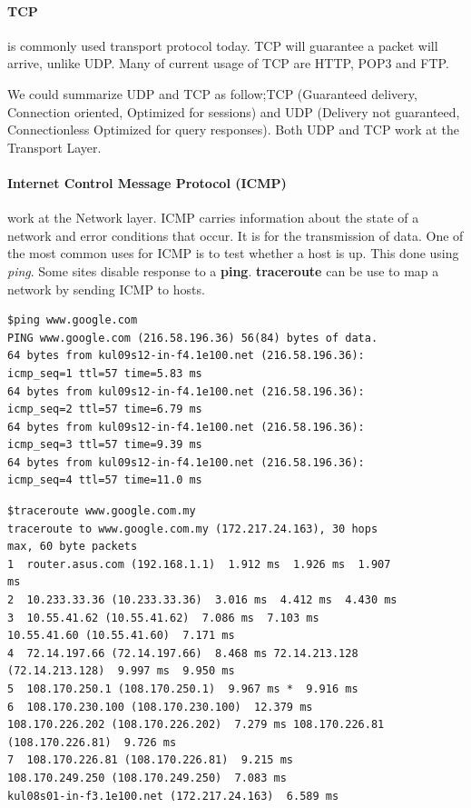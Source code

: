 \documentclass[7x9]{times}
\begin{document}
\paragraph{TCP} is commonly used transport protocol today. 
TCP will guarantee a packet will arrive, unlike UDP. Many 
of current usage of TCP are HTTP, POP3 and FTP.


We could summarize UDP and TCP as follow;TCP (Guaranteed
delivery, Connection oriented, Optimized for sessions) and
UDP (Delivery not guaranteed, Connectionless Optimized for
query responses). Both UDP and TCP work at the Transport
Layer.

\paragraph{Internet Control Message Protocol (ICMP)} work at
the Network layer. ICMP carries information about the state
of a network and error conditions that occur. It is for the
transmission of data. One of the most common uses for ICMP 
is to test whether a host is up. This done using 
\textit{ping}. Some sites disable response to a 
\textbf{ping}. \textbf{traceroute} can be use to map a 
network by sending ICMP to hosts.

\begin{verbatim}
$ping www.google.com
PING www.google.com (216.58.196.36) 56(84) bytes of data.
64 bytes from kul09s12-in-f4.1e100.net (216.58.196.36): 
icmp_seq=1 ttl=57 time=5.83 ms
64 bytes from kul09s12-in-f4.1e100.net (216.58.196.36): 
icmp_seq=2 ttl=57 time=6.79 ms
64 bytes from kul09s12-in-f4.1e100.net (216.58.196.36): 
icmp_seq=3 ttl=57 time=9.39 ms
64 bytes from kul09s12-in-f4.1e100.net (216.58.196.36): 
icmp_seq=4 ttl=57 time=11.0 ms
\end{verbatim}

\begin{verbatim}
$traceroute www.google.com.my
traceroute to www.google.com.my (172.217.24.163), 30 hops 
max, 60 byte packets
1  router.asus.com (192.168.1.1)  1.912 ms  1.926 ms  1.907 
ms
2  10.233.33.36 (10.233.33.36)  3.016 ms  4.412 ms  4.430 ms
3  10.55.41.62 (10.55.41.62)  7.086 ms  7.103 ms 
10.55.41.60 (10.55.41.60)  7.171 ms
4  72.14.197.66 (72.14.197.66)  8.468 ms 72.14.213.128 
(72.14.213.128)  9.997 ms  9.950 ms
5  108.170.250.1 (108.170.250.1)  9.967 ms *  9.916 ms
6  108.170.230.100 (108.170.230.100)  12.379 ms 
108.170.226.202 (108.170.226.202)  7.279 ms 108.170.226.81 
(108.170.226.81)  9.726 ms
7  108.170.226.81 (108.170.226.81)  9.215 ms 
108.170.249.250 (108.170.249.250)  7.083 ms 
kul08s01-in-f3.1e100.net (172.217.24.163)  6.589 ms
\end{verbatim}
\end{document}
